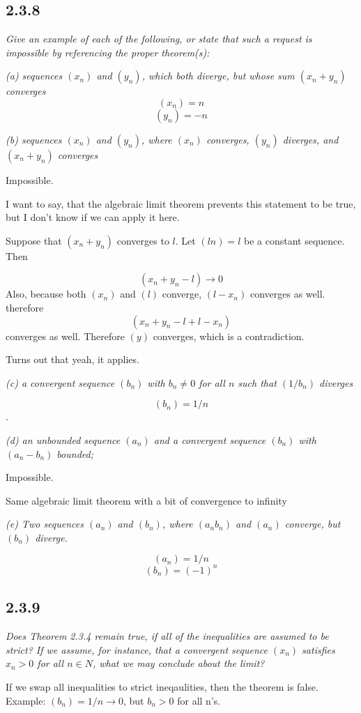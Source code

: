 \documentclass[11pt,oneside,titlepage]{book}
\begin{document}
\subsection*{2.3.8}
\textit{Give an example of each of the following, or state that such a
  request is impossible by referencing the proper theorem(s):}

\textit{(a) sequences $(x_n)$ and $(y_n)$, which both diverge, but
  whose sum $(x_n + y_n)$ converges}
$$(x_n) = n$$
$$(y_n) = -n$$

\textit{(b) sequences $(x_n)$ and $(y_n)$, where $(x_n)$ converges, $(y_n)$
  diverges, and $(x_n + y_n)$ converges}

Impossible.

I want to say, that the algebraic limit theorem prevents 
this statement to be true, but I don't know if we can apply it here.

Suppose that $(x_n + y_n)$ converges to $l$. Let $(ln) = l$ be a constant
sequence. Then

$$(x_n + y_n - l) \to 0$$
Also, because both $(x_n)$ and $(l)$ converge, $(l - x_n)$ converges as well.
therefore
$$(x_n + y_n - l+ l - x_n)$$ converges as well. Therefore $(y)$ converges,
which is a contradiction.

Turns out that yeah, it applies.

\textit{(c) a convergent sequence $(b_n)$ with $b_n \neq 0$ for all $n$ such
  that $(1/b_n)$ diverges}

$$(b_n) = 1/n$$.

\textit{(d) an unbounded sequence $(a_n)$ and a convergent sequence $(b_n)$
  with $(a_n - b_n)$ bounded;}

Impossible.

Same algebraic limit theorem with a bit of convergence to infinity

\textit{(e) Two sequences $(a_n)$ and $(b_n)$, where $(a_n b_n)$ and
  $(a_n)$ converge, but $(b_n)$ diverge.}

$$(a_n) = 1/n$$
$$(b_n) = (-1)^n$$

\subsection*{2.3.9}
\textit{Does Theorem 2.3.4 remain true, if all of the inequalities are
  assumed to be strict? If we assume, for instance, that a convergent
  sequence $(x_n)$ satisfies $x_n > 0$ for all $n \in N$, what we may conclude
  about the limit?}

If we swap all inequalities to strict ineqaulities, then the theorem is false.
Example: $(b_n) = 1/n \to 0$, but $b_n > 0$ for all n's.
\end{document}
